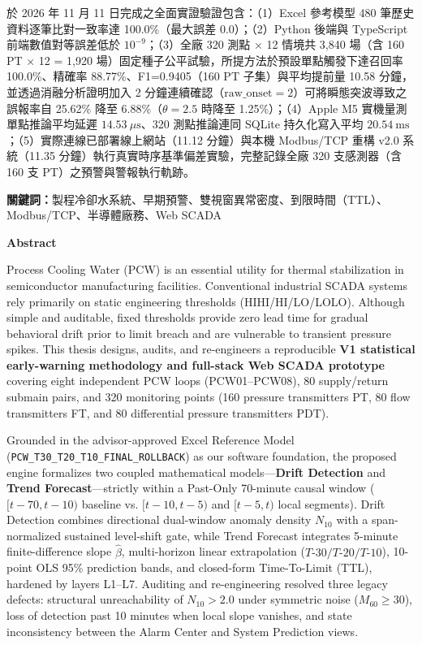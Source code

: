 \documentclass[fontset=none, a4paper, 12pt]{ctexart}
\begin{document}
於 2026 年 11 月 11 日完成之全面實證驗證包含：（1）Excel 參考模型 480 筆歷史資料逐筆比對一致率達 100.0\%（最大誤差 0.0）；（2）Python 後端與 TypeScript 前端數值對等誤差低於 $10^{-9}$；（3）全廠 320 測點 × 12 情境共 3,840 場（含 160 PT × 12 = 1,920 場）固定種子公平試驗，所提方法於預設單點觸發下達召回率 100.0\%、精確率 88.77\%、F1=0.9405（160 PT 子集）與平均提前量 10.58 分鐘，並透過消融分析證明加入 2 分鐘連續確認（$\text{raw\_onset}=2$）可將瞬態突波導致之誤報率自 25.62\% 降至 6.88\%（$\theta=2.5$ 時降至 1.25\%）；（4）Apple M5 實機量測單點推論平均延遲 $14.53\ \mu\mathrm{s}$、320 測點推論連同 SQLite 持久化寫入平均 $20.54\ \mathrm{ms}$；（5）實際連線已部署線上網站（11.12 分鐘）與本機 Modbus/TCP 重構 v2.0 系統（11.35 分鐘）執行真實時序基準偏差實驗，完整記錄全廠 320 支感測器（含 160 支 PT）之預警與警報執行軌跡。

\vspace{1em}
\noindent \textbf{關鍵詞：}製程冷卻水系統、早期預警、雙視窗異常密度、到限時間（TTL）、Modbus/TCP、半導體廠務、Web SCADA

\newpage

{}
\begin{center}
\large\bfseries Abstract
\end{center}
\vspace{0.5em}

Process Cooling Water (PCW) is an essential utility for thermal stabilization in semiconductor manufacturing facilities. Conventional industrial SCADA systems rely primarily on static engineering thresholds (HIHI/HI/LO/LOLO). Although simple and auditable, fixed thresholds provide zero lead time for gradual behavioral drift prior to limit breach and are vulnerable to transient pressure spikes. This thesis designs, audits, and re-engineers a reproducible \textbf{V1 statistical early-warning methodology and full-stack Web SCADA prototype} covering eight independent PCW loops (PCW01--PCW08), 80 supply/return submain pairs, and 320 monitoring points (160 pressure transmitters PT, 80 flow transmitters FT, and 80 differential pressure transmitters PDT).

Grounded in the advisor-approved Excel Reference Model (\texttt{PCW\_T30\_T20\_T10\_FINAL\_ROLLBACK}) as our software foundation, the proposed engine formalizes two coupled mathematical models—\textbf{Drift Detection} and \textbf{Trend Forecast}—strictly within a Past-Only 70-minute causal window ($[t-70, t-10)$ baseline vs. $[t-10, t-5)$ and $[t-5, t)$ local segments). Drift Detection combines directional dual-window anomaly density $N_{10}$ with a span-normalized sustained level-shift gate, while Trend Forecast integrates 5-minute finite-difference slope $\hat{\beta}$, multi-horizon linear extrapolation ($T\text{-}30 / T\text{-}20 / T\text{-}10$), 10-point OLS 95\% prediction bands, and closed-form Time-To-Limit (TTL), hardened by layers L1--L7. Auditing and re-engineering resolved three legacy defects: structural unreachability of $N_{10} > 2.0$ under symmetric noise ($M_{60} \ge 30$), loss of detection past 10 minutes when local slope vanishes, and state inconsistency between the Alarm Center and System Prediction views.
\end{document}
